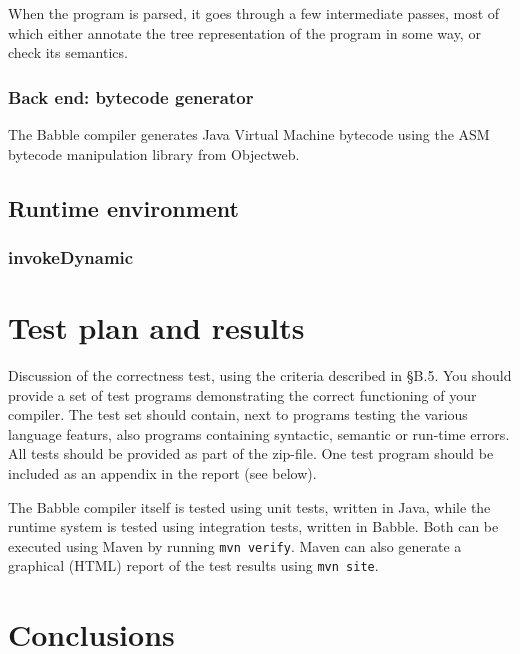 \documentclass[a4paper]{article}
\begin{document}
When the program is parsed, it goes through a few intermediate passes, most of which either annotate the tree representation of the program in some way, or check its semantics.

\subsubsection{Back end: bytecode generator}

The Babble compiler generates Java Virtual Machine bytecode using the ASM bytecode manipulation library from Objectweb.

\subsection{Runtime environment}

\subsubsection{invokeDynamic}

\section{Test plan and results}
Discussion of the correctness test, using the criteria described in §B.5. You
should provide a set of test programs demonstrating the correct functioning of your compiler. The test
set should contain, next to programs testing the various language featurs, also programs containing
syntactic, semantic or run-time errors.
All tests should be provided as part of the zip-file. One test program should be included as an appendix
in the report (see below).


The Babble compiler itself is tested using unit tests, written in Java, while the runtime system is tested using integration tests, written in Babble.
Both can be executed using Maven by running \texttt{mvn verify}.
Maven can also generate a graphical (HTML) report of the test results using \texttt{mvn site}.

\section{Conclusions}

\clearpage
\end{document}
